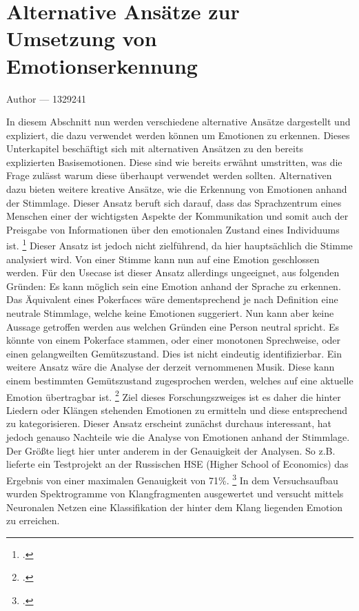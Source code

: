 \documentclass[12pt, a4paper]{report}
\makeatletter
\newcommand{\sectionauthor}[1]{%
  {\parindent0pt\vspace*{-5pt}%
  \large{Author --- }
  \linespread{1.1}\large\scshape#1%
  \par\nobreak\vspace*{35pt} }
  \@afterheading%
}
\makeatother
\begin{document}
\section{Alternative Ansätze zur Umsetzung von Emotionserkennung}
\sectionauthor{1329241}
In diesem Abschnitt nun werden verschiedene alternative Ansätze dargestellt und expliziert, die dazu verwendet werden können um Emotionen zu erkennen.
Dieses Unterkapitel beschäftigt sich mit alternativen Ansätzen zu den bereits explizierten Basisemotionen. Diese sind wie bereits erwähnt umstritten, was die Frage zulässt warum diese überhaupt verwendet werden sollten. Alternativen dazu bieten weitere kreative Ansätze, wie die Erkennung von Emotionen anhand der Stimmlage.
Dieser Ansatz beruft sich darauf, dass das Sprachzentrum eines Menschen einer der wichtigsten Aspekte der Kommunikation und somit auch der Preisgabe von Informationen über den emotionalen Zustand eines Individuums ist.
\footcite[Vgl. ][Abstract]{EmotionInSpeech}
Dieser Ansatz ist jedoch nicht zielführend, da hier hauptsächlich die Stimme analysiert wird. Von einer Stimme kann nun auf eine Emotion geschlossen werden. Für den Usecase ist dieser Ansatz allerdings ungeeignet, aus folgenden Gründen:\newline
Es kann möglich sein eine Emotion anhand der Sprache zu erkennen. Das Äquivalent eines Pokerfaces wäre dementsprechend je nach Definition eine neutrale Stimmlage, welche keine Emotionen suggeriert. Nun kann aber keine Aussage getroffen werden aus welchen Gründen eine Person neutral spricht. Es könnte von einem Pokerface stammen, oder einer monotonen Sprechweise, oder einen gelangweilten Gemütszustand. Dies ist nicht eindeutig identifizierbar.
Ein weitere Ansatz wäre die Analyse der derzeit vernommenen Musik. Diese kann einem bestimmten Gemütszustand zugesprochen werden, welches auf eine aktuelle Emotion übertragbar ist.
\footcite[Vgl.][1]{MusicEmotion}
Ziel dieses Forschungszweiges ist es daher die hinter Liedern oder Klängen stehenden Emotionen zu ermitteln und diese entsprechend zu kategorisieren.
Dieser Ansatz erscheint zunächst durchaus interessant, hat jedoch genauso Nachteile wie die Analyse von Emotionen anhand der Stimmlage.
Der Größte liegt hier unter anderem in der Genauigkeit der Analysen. So z.B. lieferte ein Testprojekt an der Russischen HSE (Higher School of Economics) das Ergebnis von einer maximalen Genauigkeit von 71\%.
\footcite[Vgl. ][Abstract]{EmotionInSound}
In dem Versuchsaufbau wurden Spektrogramme von Klangfragmenten ausgewertet und versucht mittels Neuronalen Netzen eine Klassifikation der hinter dem Klang liegenden Emotion zu erreichen.
\end{document}
